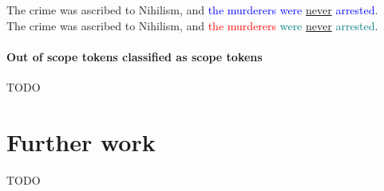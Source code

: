 \documentclass{article}
\begin{document}
\begin{displayquote}
The crime was ascribed to Nihilism, and \textcolor{blue}{the murderers were} \underline{never} \textcolor{blue}{arrested}.\\
The crime was ascribed to Nihilism, and \textcolor{red}{the murderers} \textcolor{teal}{were} \underline{never} \textcolor{teal}{arrested}.
\end{displayquote}

\paragraph {Out of scope tokens classified as scope tokens} TODO

\section{Further work}
TODO
\end{document}
